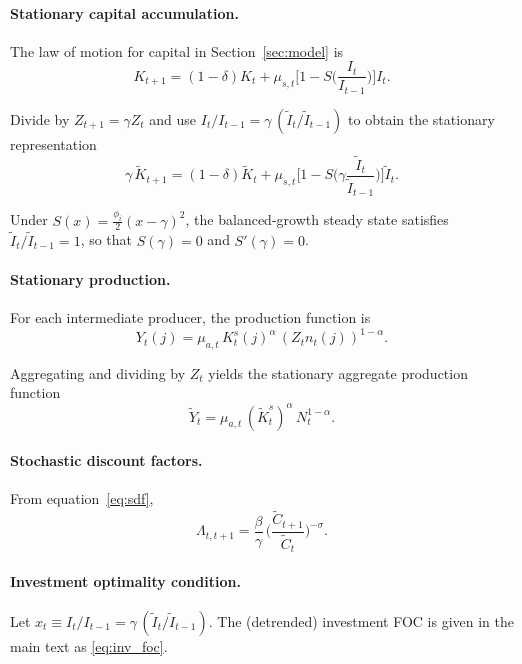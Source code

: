 \paragraph{Stationary capital accumulation.}
The law of motion for capital in Section~\ref{sec:model} is
\begin{equation}
	K_{t+1} = (1-\delta)K_t + \mu_{s,t}\Big[1-S\Big(\frac{I_t}{I_{t-1}}\Big)\Big]I_t.
\end{equation}

Divide by $Z_{t+1}=\gamma Z_t$ and use $I_t/I_{t-1}=\gamma\,(\tilde I_t/\tilde I_{t-1})$ to obtain the stationary representation
\begin{equation}
	\gamma\,\tilde K_{t+1} = (1-\delta)\tilde K_t + \mu_{s,t}\Big[1-S\Big(\gamma\frac{\tilde I_t}{\tilde I_{t-1}}\Big)\Big]\tilde I_t.
	\label{eq:cap_detrended}
\end{equation}

Under $S(x)=\frac{\phi_i}{2}(x-\gamma)^2$, the balanced-growth steady state satisfies $\tilde I_t/\tilde I_{t-1}=1$, so that $S(\gamma)=0$ and $S'(\gamma)=0$.

\paragraph{Stationary production.}
For each intermediate producer, the production function is
\begin{equation}
	Y_t(j)=\mu_{a,t}\,K_t^s(j)^{\alpha}\,(Z_t n_t(j))^{1-\alpha}.
\end{equation}

Aggregating and dividing by $Z_t$ yields the stationary aggregate production function
\begin{equation}
	\tilde Y_t = \mu_{a,t}\,(\tilde K_t^s)^{\alpha}\,N_t^{1-\alpha}.
	\label{eq:prod_detrended}
\end{equation}

\paragraph{Stochastic discount factors.}
From equation~\eqref{eq:sdf},
\begin{equation}
	\Lambda_{t,t+1}
	=\frac{\beta}{\gamma}\,\Big(\frac{\tilde C_{t+1}}{\tilde C_t}\Big)^{-\sigma}.
	\label{eq:sdf_real}
\end{equation}

\paragraph{Investment optimality condition.}
Let $x_t\equiv I_t/I_{t-1}=\gamma\,(\tilde I_t/\tilde I_{t-1})$. The (detrended) investment FOC is given in the main text as \eqref{eq:inv_foc}.

